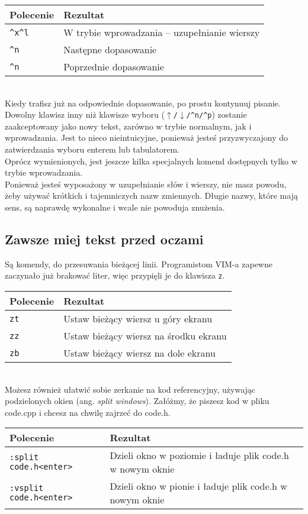 \documentclass[a4paper,12pt]{article}
\begin{document}
\begin{tabular}{ l | p{} }
{\bf Polecenie} & {\bf Rezultat} \\ \hline
{\tt \^{}x\^{}l} & W trybie wprowadzania – uzupełnianie wierszy \\
{\tt \^{}n} & Następne dopasowanie \\
{\tt \^{}n} & Poprzednie dopasowanie \\ \hline
\end{tabular}\\

\noindent
Kiedy trafisz już na odpowiednie dopasowanie, po prostu kontynuuj pisanie. Dowolny klawisz inny niż klawisze wyboru ({\tt $\uparrow$/$\downarrow$/\^{}n/\^{}p}) zostanie zaakceptowany jako nowy tekst, zarówno w trybie normalnym, jak i wprowadzania. Jest to nieco nieintuicyjne, ponieważ jesteś przyzwyczajony do zatwierdzania wyboru enterem lub tabulatorem.\\
Oprócz wymienionych, jest jeszcze kilka specjalnych komend dostępnych tylko w trybie wprowadzania.\\
Ponieważ jesteś wyposażony w uzupełnianie słów i wierszy, nie masz powodu, żeby używać krótkich i tajemniczych nazw zmiennych. Długie nazwy, które mają sens, są naprawdę wykonalne i wcale nie powoduja znużenia.
\subsection{Zawsze miej tekst przed oczami}
Są komendy, do przesuwania bieżącej linii. Programistom VIM-a zapewne zaczynało już brakować liter, więc przypięli je do klawisza {\tt z}.

\begin{tabular}{ l | p{} }
{\bf Polecenie} & {\bf Rezultat} \\ \hline
{\tt zt} & Ustaw bieżący wiersz u góry ekranu \\
{\tt zz} & Ustaw bieżący wiersz na środku ekranu \\
{\tt zb} & Ustaw bieżący wiersz na dole ekranu \\ \hline
\end{tabular}\\

\noindent
Możesz również ułatwić sobie zerkanie na kod referencyjny, używając podzielonych okien (ang. {\it split windows}). Załóżmy, że piszesz kod w pliku code.cpp i chcesz na chwilę zajrzeć do code.h.

\begin{tabular}{ l | p{7cm} }
{\bf Polecenie} & {\bf Rezultat} \\ \hline
{\tt :split code.h<enter>} & Dzieli okno w poziomie i ładuje plik code.h w nowym oknie \\
{\tt :vsplit code.h<enter>} & Dzieli okno w pionie i ładuje plik code.h w nowym oknie \\ \hline
\end{tabular}\\
\end{document}
